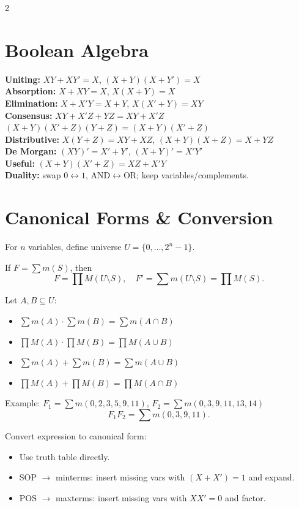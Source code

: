 \documentclass[10pt]{article}
\begin{document}
{\begin{multicols}{2}
\section*{Boolean Algebra}
\textbf{Uniting:} $XY+XY'=X$, $(X+Y)(X+Y')=X$\\
\textbf{Absorption:} $X+XY=X$, $X(X+Y)=X$\\
\textbf{Elimination:} $X+X'Y=X+Y$, $X(X'+Y)=XY$\\
\textbf{Consensus:} $XY+X'Z+YZ=XY+X'Z$\\
$(X+Y)(X'+Z)(Y+Z)=(X+Y)(X'+Z)$\\
\textbf{Distributive:} $X(Y+Z)=XY+XZ$,
$(X+Y)(X+Z)=X+YZ$\\
\textbf{De Morgan:} $(XY)'=X'+Y'$, $(X+Y)'=X'Y'$\\
\textbf{Useful:} $(X+Y)(X'+Z)=XZ+X'Y$\\
\textbf{Duality:} swap $0\leftrightarrow1$, AND$\leftrightarrow$OR; keep variables/complements.

\section*{Canonical Forms \& Conversion}
For $n$ variables, define universe $U=\{0,\dots,2^n-1\}$.

If $F=\sum m(S)$, then
\[ F=\prod M(U\setminus S),\quad F'=\sum m(U\setminus S)=\prod M(S). \]

Let $A,B\subseteq U$:
\begin{itemize}
    \item $\sum m(A)\cdot\sum m(B)=\sum m(A\cap B)$
    \item $\prod M(A)\cdot\prod M(B)=\prod M(A\cup B)$
    \item $\sum m(A)+\sum m(B)=\sum m(A\cup B)$
    \item $\prod M(A)+\prod M(B)=\prod M(A\cap B)$
\end{itemize}

Example: $F_1=\sum m(0,2,3,5,9,11)$,
$F_2=\sum m(0,3,9,11,13,14)$
\[F_1F_2=\sum m(0,3,9,11).\]

Convert expression to canonical form:
\begin{itemize}
    \item Use truth table directly.
    \item SOP $\to$ minterms: insert missing vars with $(X+X')=1$ and expand.
    \item POS $\to$ maxterms: insert missing vars with $XX'=0$ and factor.
\end{itemize}


\end{multicols}}
\end{document}
